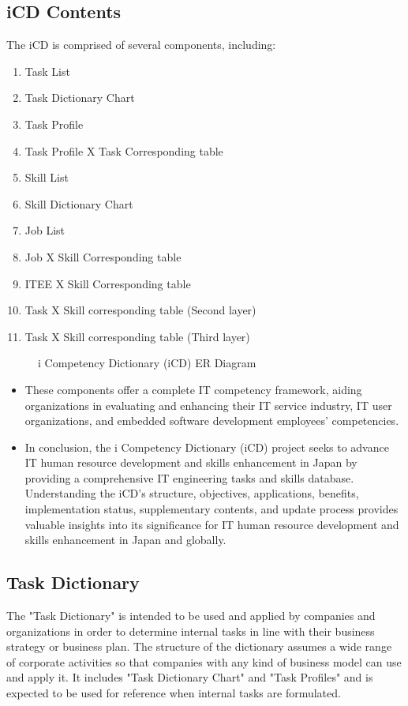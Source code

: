\subsection{iCD Contents}
The iCD is comprised of several components, including:

\begin{enumerate}
    \item Task List
    \item Task Dictionary Chart
    \item Task Profile
    \item Task Profile X Task Corresponding table
    \item Skill List
    \item Skill Dictionary Chart
    \item Job List
    \item Job X Skill Corresponding table
    \item ITEE X Skill Corresponding table
    \item Task X Skill corresponding table (Second layer)
    \item Task X Skill corresponding table (Third layer)
\end{enumerate}

\begin{figure}[H]
    \centering
    \caption{ i Competency Dictionary (iCD) ER Diagram }
    \label{fig:iCD_ER_Diagram}
\end{figure}

\begin{itemize}
    \renewcommand\labelitemi{-}
    \item These components offer a complete IT competency framework, aiding organizations in evaluating and enhancing their IT service industry, IT user organizations, and embedded software development employees' competencies.
    \item In conclusion, the i Competency Dictionary (iCD) project seeks to advance IT human resource development and skills enhancement in Japan by providing a comprehensive IT engineering tasks and skills database. Understanding the iCD's structure, objectives, applications, benefits, implementation status, supplementary contents, and update process provides valuable insights into its significance for IT human resource development and skills enhancement in Japan and globally.
\end{itemize}

\newpage
\subsection{Task Dictionary}
The "Task Dictionary" is intended to be used and applied by companies and organizations in order to
determine internal tasks in line with their business strategy or business plan. The structure of the dictionary
assumes a wide range of corporate activities so that companies with any kind of business model can use
and apply it.
It includes "Task Dictionary Chart" and "Task Profiles" and is expected to be used for reference when
internal tasks are formulated.

